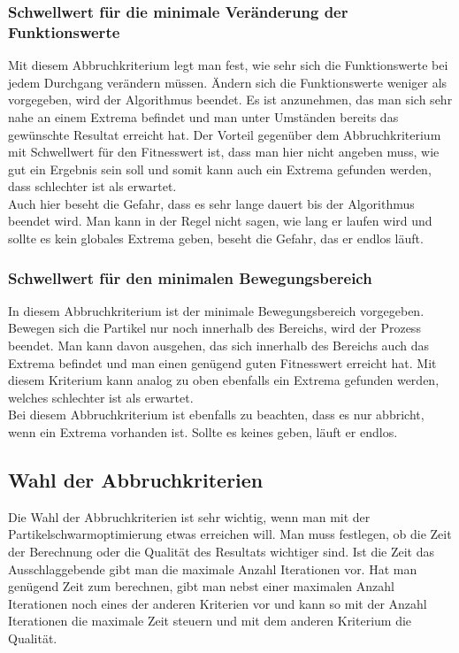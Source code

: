 \subsubsection{Schwellwert für die minimale Veränderung der Funktionswerte}
Mit diesem Abbruchkriterium legt man fest, wie sehr sich die Funktionswerte bei jedem Durchgang verändern müssen. Ändern sich die Funktionswerte weniger als vorgegeben, wird der Algorithmus beendet. Es ist anzunehmen, das man sich sehr nahe an einem Extrema befindet und man unter Umständen bereits das gewünschte Resultat erreicht hat. Der Vorteil gegenüber dem Abbruchkriterium mit Schwellwert für den Fitnesswert ist, dass man hier nicht angeben muss, wie gut ein Ergebnis sein soll und somit kann auch ein Extrema gefunden werden, dass schlechter ist als erwartet. \\ 
Auch hier beseht die Gefahr, dass es sehr lange dauert bis der Algorithmus beendet wird. Man kann in der Regel nicht sagen, wie lang er laufen wird und sollte es kein globales Extrema geben, beseht die Gefahr, das er endlos läuft. 

\subsubsection{Schwellwert für den minimalen Bewegungsbereich}
In diesem Abbruchkriterium ist der minimale Bewegungsbereich vorgegeben. Bewegen sich die Partikel nur noch innerhalb des Bereichs, wird der Prozess beendet. Man kann davon ausgehen, das sich innerhalb des Bereichs auch das Extrema befindet und man einen genügend guten Fitnesswert erreicht hat. Mit diesem Kriterium kann analog zu oben ebenfalls ein Extrema gefunden werden, welches schlechter ist als erwartet.\\
Bei diesem Abbruchkriterium ist ebenfalls zu beachten, dass es nur abbricht, wenn ein Extrema vorhanden ist. Sollte es keines geben, läuft er endlos.

\subsection{Wahl der Abbruchkriterien}
Die Wahl der Abbruchkriterien ist sehr wichtig, wenn man mit der Partikelschwarmoptimierung etwas erreichen will. Man muss festlegen, ob die Zeit der Berechnung oder die Qualität des Resultats wichtiger sind. Ist die Zeit das Ausschlaggebende gibt man die maximale Anzahl Iterationen vor. Hat man genügend Zeit zum berechnen, gibt man nebst einer maximalen Anzahl Iterationen noch eines der anderen Kriterien vor und kann so mit der Anzahl Iterationen die maximale Zeit steuern und mit dem anderen Kriterium die Qualität. 

